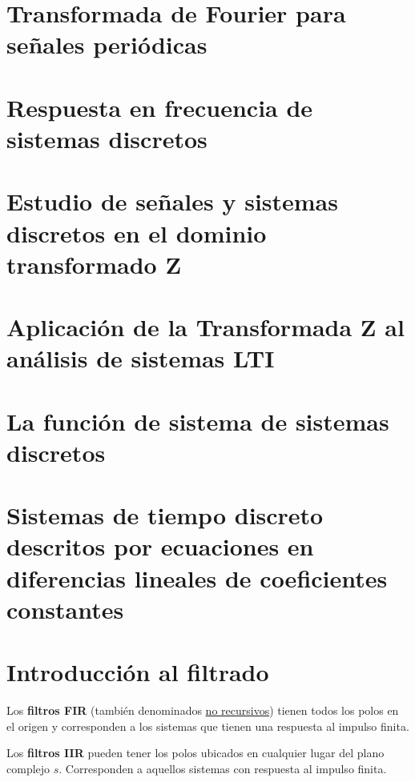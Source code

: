 \documentclass[a4paper]{book}
\begin{document}
\section{Transformada de Fourier para señales periódicas}

\section{Respuesta en frecuencia de sistemas discretos}

\section{Estudio de señales y sistemas discretos en el dominio transformado Z}

\section{Aplicación de la Transformada Z al análisis de sistemas LTI}

\section{La función de sistema de sistemas discretos}

\section{Sistemas de tiempo discreto descritos por ecuaciones en diferencias lineales de coeficientes constantes}

\section{Introducción al filtrado}
Los \textbf{filtros FIR} (también denominados \underline{no recursivos}) tienen todos los polos en el origen y corresponden a los sistemas que tienen una respuesta al impulso finita.

Los \textbf{filtros IIR} pueden tener los polos ubicados en cualquier lugar del plano complejo $s$. Corresponden a aquellos sistemas con respuesta al impulso finita.
\appendix

\newpage
{}
\titlespacing*{\chapter}{0pt}{-19pt}{0pt}
\end{document}

